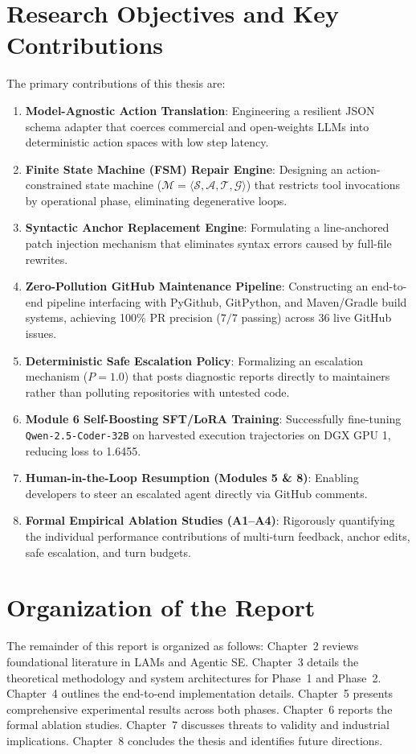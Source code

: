 \documentclass[12pt,a4paper]{report}
\begin{document}
\section{Research Objectives and Key Contributions}
The primary contributions of this thesis are:
\begin{enumerate}
    \item \textbf{Model-Agnostic Action Translation}: Engineering a resilient JSON schema adapter that coerces commercial and open-weights LLMs into deterministic action spaces with low step latency.
    \item \textbf{Finite State Machine (FSM) Repair Engine}: Designing an action-constrained state machine ($\mathcal{M} = \langle\mathcal{S}, \mathcal{A}, \mathcal{T}, \mathcal{G}\rangle$) that restricts tool invocations by operational phase, eliminating degenerative loops.
    \item \textbf{Syntactic Anchor Replacement Engine}: Formulating a line-anchored patch injection mechanism that eliminates syntax errors caused by full-file rewrites.
    \item \textbf{Zero-Pollution GitHub Maintenance Pipeline}: Constructing an end-to-end pipeline interfacing with PyGithub, GitPython, and Maven/Gradle build systems, achieving 100\% PR precision ($7/7$ passing) across 36 live GitHub issues.
    \item \textbf{Deterministic Safe Escalation Policy}: Formalizing an escalation mechanism ($P = 1.0$) that posts diagnostic reports directly to maintainers rather than polluting repositories with untested code.
    \item \textbf{Module 6 Self-Boosting SFT/LoRA Training}: Successfully fine-tuning \texttt{Qwen-2.5-Coder-32B} on harvested execution trajectories on DGX GPU 1, reducing loss to 1.6455.
    \item \textbf{Human-in-the-Loop Resumption (Modules 5 \& 8)}: Enabling developers to steer an escalated agent directly via GitHub comments.
    \item \textbf{Formal Empirical Ablation Studies (A1--A4)}: Rigorously quantifying the individual performance contributions of multi-turn feedback, anchor edits, safe escalation, and turn budgets.
\end{enumerate}

\section{Organization of the Report}
The remainder of this report is organized as follows: Chapter~2 reviews foundational literature in LAMs and Agentic SE. Chapter~3 details the theoretical methodology and system architectures for Phase~1 and Phase~2. Chapter~4 outlines the end-to-end implementation details. Chapter~5 presents comprehensive experimental results across both phases. Chapter~6 reports the formal ablation studies. Chapter~7 discusses threats to validity and industrial implications. Chapter~8 concludes the thesis and identifies future directions.
\end{document}
